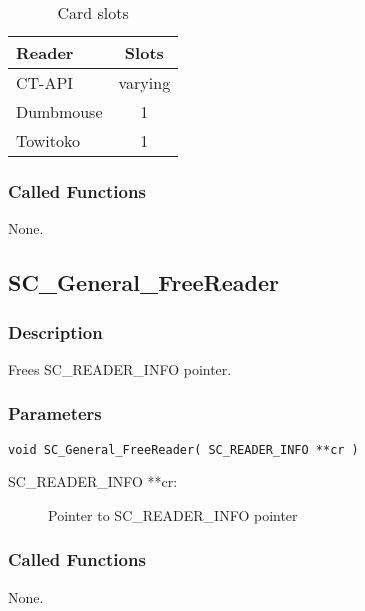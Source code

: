 \documentclass[a4paper,oneside]{article}
\begin{document}
\begin{table}[h!]
\caption{Card slots}
\begin{center}
\begin{tabular}{|l|c|} \hline
Reader & Slots \\ \hline \hline
CT-API & varying \\ \hline
Dumbmouse & 1 \\ \hline
Towitoko & 1 \\ \hline
\end{tabular}
\end{center}
\end{table}

\subsubsection*{Called Functions}

None.


\subsection{SC\_General\_FreeReader}

\subsubsection*{Description}

Frees SC\_READER\_INFO pointer.

\subsubsection*{Parameters}

\begin{verbatim}
void SC_General_FreeReader( SC_READER_INFO **cr )
\end{verbatim}

\begin{description}
\item[SC\_READER\_INFO **cr:] Pointer to SC\_READER\_INFO pointer
\end{description}

\subsubsection*{Called Functions}

None.

\end{document}
